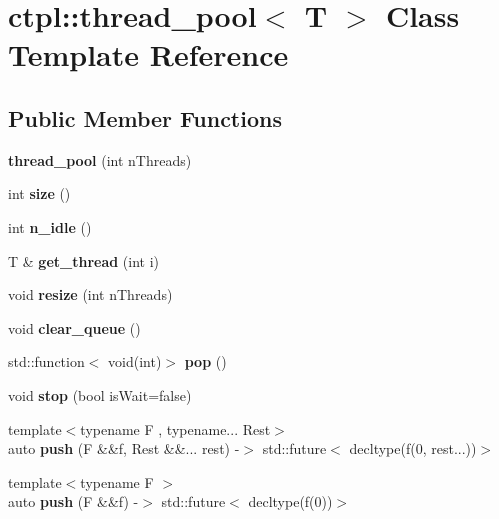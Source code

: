 \hypertarget{classctpl_1_1thread__pool}{}\section{ctpl\+:\+:thread\+\_\+pool$<$ T $>$ Class Template Reference}
\label{classctpl_1_1thread__pool}
\subsection*{Public Member Functions}
\begin{DoxyCompactItemize}
\item 
\mbox{\label{classctpl_1_1thread__pool_a8cbc9d02323c0494c12f2205b76cd97a}} 
{\bfseries thread\+\_\+pool} (int n\+Threads)
\item 
\mbox{\label{classctpl_1_1thread__pool_a43e0d9660a610fd36d3a3ef05742c124}} 
int {\bfseries size} ()
\item 
\mbox{\label{classctpl_1_1thread__pool_afff06541d5b6d640ced059f8104c73fd}} 
int {\bfseries n\+\_\+idle} ()
\item 
\mbox{\label{classctpl_1_1thread__pool_a671a47dd92273b92863d65205fb00665}} 
T \& {\bfseries get\+\_\+thread} (int i)
\item 
\mbox{\label{classctpl_1_1thread__pool_a5616835c86ef785a07a2ca3311a93956}} 
void {\bfseries resize} (int n\+Threads)
\item 
\mbox{\label{classctpl_1_1thread__pool_adf4ad2b34040beddf63b679096bb36fa}} 
void {\bfseries clear\+\_\+queue} ()
\item 
\mbox{\label{classctpl_1_1thread__pool_ae21941f71d94787161b927ee66904f9a}} 
std\+::function$<$ void(int)$>$ {\bfseries pop} ()
\item 
\mbox{\label{classctpl_1_1thread__pool_a1f16a023992e5d1dfbb442cdfb640bcb}} 
void {\bfseries stop} (bool is\+Wait=false)
\item 
\mbox{\label{classctpl_1_1thread__pool_aefdd0e6eae5ef91b2b23878d268b43d7}} 
{\footnotesize template$<$typename F , typename... Rest$>$ }\\auto {\bfseries push} (F \&\&f, Rest \&\&... rest) -\/$>$ std\+::future$<$ decltype(f(0, rest...))$>$
\item 
\mbox{\label{classctpl_1_1thread__pool_a2e127b44a824f43c5d3eb96dc5fb2212}} 
{\footnotesize template$<$typename F $>$ }\\auto {\bfseries push} (F \&\&f) -\/$>$ std\+::future$<$ decltype(f(0))$>$
\end{DoxyCompactItemize}


